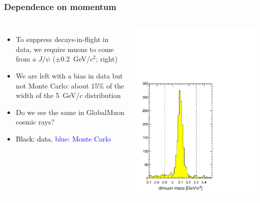 \documentclass[compress]{beamer}
\begin{document}
\begin{frame}
\frametitle{Dependence on momentum}
\begin{columns}
\begin{itemize}
\item To suppress decays-in-flight in data, we require muons to come
  from a $J/\psi$ ($\pm 0.2$~GeV/$c^2$; right)
\item We are left with a bias in data but not Monte
  Carlo: about 15\% of the width of the 5~GeV/$c$ distribution
\item Do we see the same in GlobalMuon cosmic rays?
\item \textcolor{black}{Black: data}, \textcolor{blue}{blue: Monte Carlo}
\end{itemize}

\includegraphics[width=\linewidth]{nocuts_jpsi_mass.pdf}
\end{columns}


\end{frame}
\end{document}
